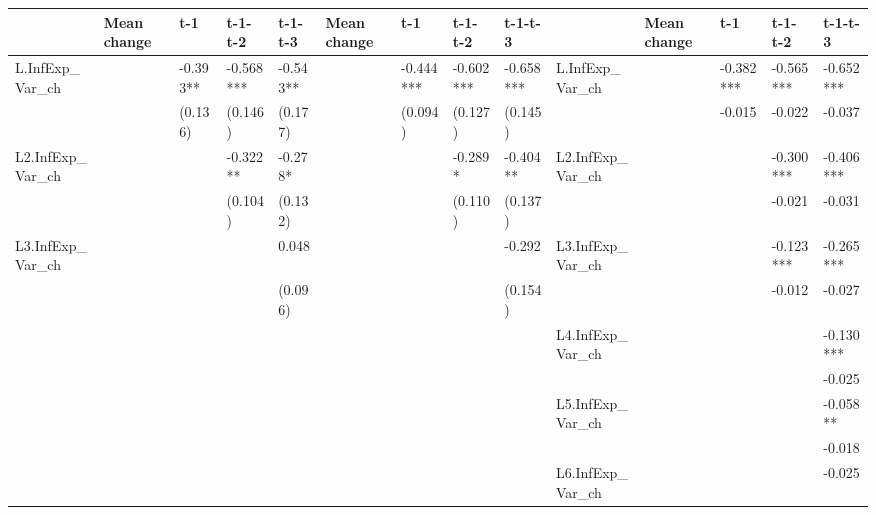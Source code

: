 \documentclass[12pt]{article}
\begin{document}
\begin{table}
\begin{adjustbox}{width={24cm},totalheight={14cm}}
\begin{threeparttable}
\begin{tabular}{llllllllllllll}
					& Mean change & t-1       & t-1- t-2  & t-1-t-3   & Mean change   & t-1       & t-1- t-2  & t-1-t-3   &                      & Mean change   & t-1       & t-1- t-2  & t-1-t-3   \\
					\hline 
					L.InfExp\_Var\_ch    &             & -0.393**  & -0.568*** & -0.543**  &               & -0.444*** & -0.602*** & -0.658*** & L.InfExp\_Var\_ch    &               & -0.382*** & -0.565*** & -0.652*** \\
					&             & (0.136)   & (0.146)   & (0.177)   &               & (0.094)   & (0.127)   & (0.145)   &                      &               & -0.015    & -0.022    & -0.037    \\
					L2.InfExp\_Var\_ch   &             &           & -0.322**  & -0.278*   &               &           & -0.289*   & -0.404**  & L2.InfExp\_Var\_ch   &               &           & -0.300*** & -0.406*** \\
					&             &           & (0.104)   & (0.132)   &               &           & (0.110)   & (0.137)   &                      &               &           & -0.021    & -0.031    \\
					L3.InfExp\_Var\_ch   &             &           &           & 0.048     &               &           &           & -0.292    & L3.InfExp\_Var\_ch   &               &           & -0.123*** & -0.265*** \\
					&             &           &           & (0.096)   &               &           &           & (0.154)   &                      &               &           & -0.012    & -0.027    \\
					&             &           &           &           &               &           &           &           & L4.InfExp\_Var\_ch   &               &           &           & -0.130*** \\
					&             &           &           &           &               &           &           &           &                      &               &           &           & -0.025    \\
					&             &           &           &           &               &           &           &           & L5.InfExp\_Var\_ch   &               &           &           & -0.058**  \\
					&             &           &           &           &               &           &           &           &                      &               &           &           & -0.018    \\
					&             &           &           &           &               &           &           &           & L6.InfExp\_Var\_ch   &               &           &           & -0.025    \\

\end{tabular}
\end{threeparttable}
\end{adjustbox}
\end{table}
\end{document}
